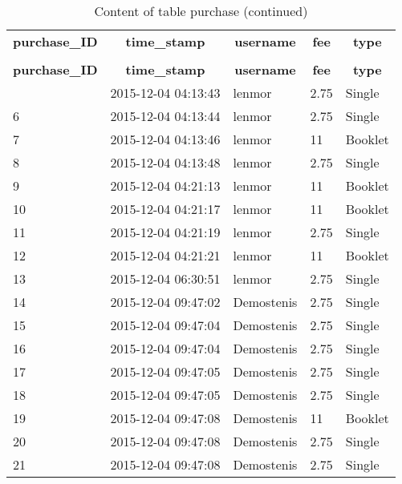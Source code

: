 %
%
 \begin{longtable}{|l|l|l|l|l|} 
 \hline \endhead \hline \endfoot \hline 
 \caption{Content of table purchase} \label{tab:purchase-data} \\\hline \multicolumn{1}{|c|}{\textbf{purchase\_ID}} & \multicolumn{1}{|c|}{\textbf{time\_stamp}} & \multicolumn{1}{|c|}{\textbf{username}} & \multicolumn{1}{|c|}{\textbf{fee}} & \multicolumn{1}{|c|}{\textbf{type}} \\ \hline \hline  \endfirsthead 
\caption{Content of table purchase (continued)} \\ \hline \multicolumn{1}{|c|}{\textbf{purchase\_ID}} & \multicolumn{1}{|c|}{\textbf{time\_stamp}} & \multicolumn{1}{|c|}{\textbf{username}} & \multicolumn{1}{|c|}{\textbf{fee}} & \multicolumn{1}{|c|}{\textbf{type}} \\ \hline \hline \endhead \endfoot
5 & 2015-12-04 04:13:43 & lenmor & 2.75 & Single \\ \hline 
6 & 2015-12-04 04:13:44 & lenmor & 2.75 & Single \\ \hline 
7 & 2015-12-04 04:13:46 & lenmor & 11 & Booklet \\ \hline 
8 & 2015-12-04 04:13:48 & lenmor & 2.75 & Single \\ \hline 
9 & 2015-12-04 04:21:13 & lenmor & 11 & Booklet \\ \hline 
10 & 2015-12-04 04:21:17 & lenmor & 11 & Booklet \\ \hline 
11 & 2015-12-04 04:21:19 & lenmor & 2.75 & Single \\ \hline 
12 & 2015-12-04 04:21:21 & lenmor & 11 & Booklet \\ \hline 
13 & 2015-12-04 06:30:51 & lenmor & 2.75 & Single \\ \hline 
14 & 2015-12-04 09:47:02 & Demostenis & 2.75 & Single \\ \hline 
15 & 2015-12-04 09:47:04 & Demostenis & 2.75 & Single \\ \hline 
16 & 2015-12-04 09:47:04 & Demostenis & 2.75 & Single \\ \hline 
17 & 2015-12-04 09:47:05 & Demostenis & 2.75 & Single \\ \hline 
18 & 2015-12-04 09:47:05 & Demostenis & 2.75 & Single \\ \hline 
19 & 2015-12-04 09:47:08 & Demostenis & 11 & Booklet \\ \hline 
20 & 2015-12-04 09:47:08 & Demostenis & 2.75 & Single \\ \hline 
21 & 2015-12-04 09:47:08 & Demostenis & 2.75 & Single \\ \hline 

\end{longtable}
